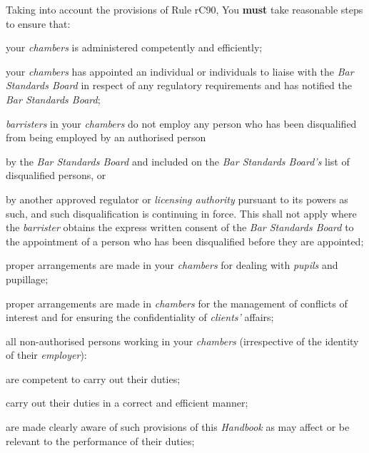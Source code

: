 


Taking into account the provisions of Rule rC90, You \textcolor{myred}{\textbf{must}} take
reasonable steps to ensure that:
\begin{numlist}
\item your \emph{chambers} is administered competently and efficiently;

\item your \emph{chambers} has appointed an individual or individuals to
liaise with the \emph{Bar Standards Board} in respect of any regulatory
requirements and has notified the \emph{Bar Standards Board};

\item \emph{barristers} in your \emph{chambers} do not employ any person
who has been disqualified from being employed by an authorised person
\begin{romlist}
\item by the \emph{Bar Standards Board} and included on the \emph{Bar
Standards Board's} list of disqualified persons, or 
\item by another
approved regulator or \emph{licensing authority} pursuant to its powers
as such, and such disqualification is continuing in force. This shall
not apply where the \emph{barrister} obtains the express written consent
of the \emph{Bar Standards Board} to the appointment of a person who has
been disqualified before they are appointed;\end{romlist}
\item proper arrangements are made in your \emph{chambers} for dealing with
\emph{pupils} and pupillage;

\item proper arrangements are made in \emph{chambers} for the management of
conflicts of interest and for ensuring the confidentiality of
\emph{clients'} affairs;

\item all non-authorised persons working in your \emph{chambers}
(irrespective of the identity of their \emph{employer}):
\begin{alphlist}
\item are competent to carry out their duties;

\item carry out their duties in a correct and efficient manner;

\item are made clearly aware of such provisions of this \emph{Handbook} as
may affect or be relevant to the performance of their duties;


\end{alphlist}
\end{numlist}
